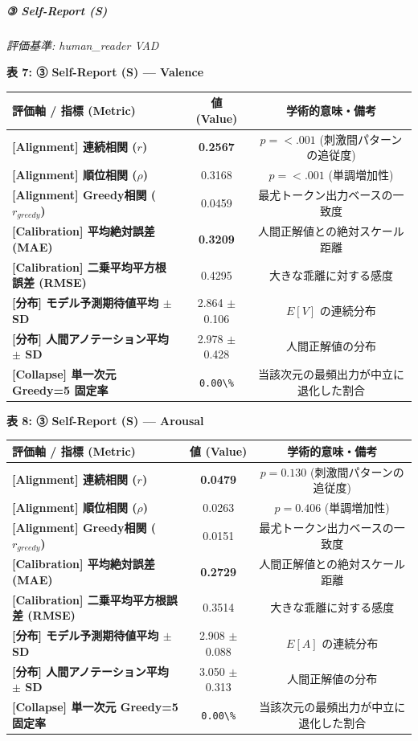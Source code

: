 \subparagraph{③ Self-Report (S)}
\textit{評価基準: human\_reader VAD}

\textbf{表 7: ③ Self-Report (S) — Valence}
\begin{center}
\small
\begin{tabular}{lcc}
\toprule
\textbf{評価軸 / 指標 (Metric)} & \textbf{値 (Value)} & \textbf{学術的意味・備考} \\
\midrule
\textbf{[Alignment] 連続相関 ($r$)} & \textbf{0.2567} & $p = <.001 $ (刺激間パターンの追従度) \\
\textbf{[Alignment] 順位相関 ($\rho$)} & 0.3168 & $p = <.001 $ (単調増加性) \\
\textbf{[Alignment] Greedy相関 ($r_{greedy}$)} & 0.0459 & 最尤トークン出力ベースの一致度 \\
\textbf{[Calibration] 平均絶対誤差 (MAE)} & \textbf{0.3209} & 人間正解値との絶対スケール距離 \\
\textbf{[Calibration] 二乗平均平方根誤差 (RMSE)} & 0.4295 & 大きな乖離に対する感度 \\
\textbf{[分布] モデル予測期待値平均 $\pm$ SD} & 2.864 $\pm$ 0.106 & $E[V]$ の連続分布 \\
\textbf{[分布] 人間アノテーション平均 $\pm$ SD} & 2.978 $\pm$ 0.428 & 人間正解値の分布 \\
\textbf{[Collapse] 単一次元 Greedy=5 固定率} & \texttt{0.00\textbackslash{}\%} & 当該次元の最頻出力が中立に退化した割合 \\
\bottomrule
\end{tabular}
\end{center}


\textbf{表 8: ③ Self-Report (S) — Arousal}
\begin{center}
\small
\begin{tabular}{lcc}
\toprule
\textbf{評価軸 / 指標 (Metric)} & \textbf{値 (Value)} & \textbf{学術的意味・備考} \\
\midrule
\textbf{[Alignment] 連続相関 ($r$)} & \textbf{0.0479} & $p = 0.130 $ (刺激間パターンの追従度) \\
\textbf{[Alignment] 順位相関 ($\rho$)} & 0.0263 & $p = 0.406 $ (単調増加性) \\
\textbf{[Alignment] Greedy相関 ($r_{greedy}$)} & 0.0151 & 最尤トークン出力ベースの一致度 \\
\textbf{[Calibration] 平均絶対誤差 (MAE)} & \textbf{0.2729} & 人間正解値との絶対スケール距離 \\
\textbf{[Calibration] 二乗平均平方根誤差 (RMSE)} & 0.3514 & 大きな乖離に対する感度 \\
\textbf{[分布] モデル予測期待値平均 $\pm$ SD} & 2.908 $\pm$ 0.088 & $E[A]$ の連続分布 \\
\textbf{[分布] 人間アノテーション平均 $\pm$ SD} & 3.050 $\pm$ 0.313 & 人間正解値の分布 \\
\textbf{[Collapse] 単一次元 Greedy=5 固定率} & \texttt{0.00\textbackslash{}\%} & 当該次元の最頻出力が中立に退化した割合 \\
\bottomrule
\end{tabular}
\end{center}



